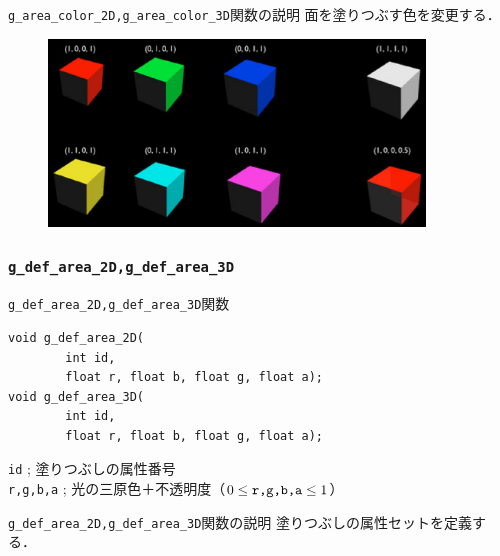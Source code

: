\documentclass[a4paper,12pt]{jsarticle}%
\begin{document}
\begin{itembox}[l]{\texttt{g\_area\_color\_2D,g\_area\_color\_3D}関数の説明}
面を塗りつぶす色を変更する．
\end{itembox}

\begin{figure}[htb]
	\includegraphics[width=100mm]{./Figures/eps/Canvas_g_area_color.eps}
\end{figure}

\clearpage
\subsubsection{\texttt{g\_def\_area\_2D,g\_def\_area\_3D}}

\begin{itembox}[l]{\texttt{g\_def\_area\_2D,g\_def\_area\_3D}関数}
\begin{verbatim}
void g_def_area_2D(
        int id,	
        float r, float b, float g, float a);
void g_def_area_3D(
        int id,	
        float r, float b, float g, float a);
\end{verbatim}
\verb|id| ; 塗りつぶしの属性番号\\
\verb|r,g,b,a| ; 光の三原色＋不透明度（$0\leq \verb|r,g,b,a| \leq 1$）\\
\end{itembox}

\begin{itembox}[l]{\texttt{g\_def\_area\_2D,g\_def\_area\_3D}関数の説明}
塗りつぶしの属性セットを定義する．
\end{itembox}
\end{document}
